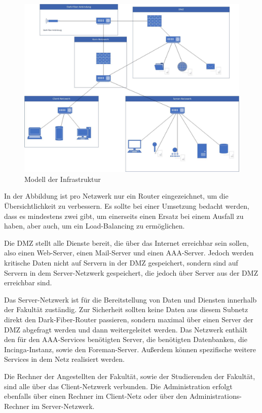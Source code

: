 \begin{figure}
  \includegraphics[width=\linewidth]{pictures/netzwerk-diagramm.jpg}
  \caption{Modell der Infrastruktur}
  \label{fig:model}
\end{figure}

In der Abbildung ist pro Netzwerk nur ein Router eingezeichnet, um die Übersichtlichkeit zu verbessern. Es sollte bei einer Umsetzung bedacht werden, dass es mindestens zwei gibt, um einerseits einen Ersatz bei einem Ausfall zu haben, aber auch, um  ein Load-Balancing zu ermöglichen.

Die DMZ stellt alle Dienste bereit, die über das Internet erreichbar sein sollen, also einen Web-Server, einen Mail-Server und einen AAA-Server. Jedoch werden kritische Daten nicht auf Servern in der DMZ gespeichert, sondern sind auf Servern in dem Server-Netzwerk gespeichert, die jedoch über Server aus der DMZ erreichbar sind.

Das Server-Netzwerk ist für die Bereitstellung von Daten und Diensten innerhalb der Fakultät zuständig. Zur Sicherheit sollten keine Daten aus diesem Subnetz direkt den Dark-Fiber-Router passieren, sondern maximal über einen Server der DMZ abgefragt werden und dann weitergeleitet werden.
Das Netzwerk enthält den für den AAA-Services benötigten Server, die benötigten Datenbanken, die Incinga-Instanz, sowie den Foreman-Server. Außerdem können spezifische weitere Services in dem Netz realisiert werden.

Die Rechner der Angestellten der Fakultät, sowie der Studierenden der Fakultät, sind alle über das Client-Netzwerk verbunden. Die Administration erfolgt ebenfalls über einen Rechner im Client-Netz oder über den Administrations-Rechner im Server-Netzwerk.


